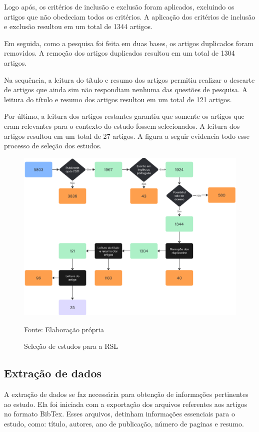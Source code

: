 Logo após, os critérios de inclusão e exclusão foram aplicados, excluindo os artigos que não obedeciam todos os critérios. A aplicação dos critérios de inclusão e exclusão resultou em um total de 1344 artigos.

Em seguida, como a pesquisa foi feita em duas bases, os artigos duplicados foram removidos. A remoção dos artigos duplicados resultou em um total de 1304 artigos.

Na sequência, a leitura do título e resumo dos artigos permitiu realizar o descarte de artigos que ainda sim não respondiam nenhuma das questões de pesquisa. A leitura do título e resumo dos artigos resultou em um total de 121 artigos.

Por último, a leitura dos artigos restantes garantiu que somente os artigos que eram relevantes para o contexto do estudo fossem selecionados. A leitura dos artigos resultou em um total de 27 artigos. A figura a seguir evidencia todo esse processo de seleção dos estudos.

\begin{figure}[H]
	\centering %
	\includegraphics[width=16cm]{figuras/selecao-estudos-rsl.png} %
	\caption{Seleção de estudos para a RSL}
	Fonte: Elaboração própria
	\label{figura:selecao-estudos-rsl}
\end{figure}

\subsection{Extração de dados}

A extração de dados se faz necessária para obtenção de informações pertinentes ao estudo. Ela foi iniciada com a exportação dos arquivos referentes aos artigos no formato BibTex. Esses arquivos, detinham informações essenciais para o estudo, como: título, autores, ano de publicação, número de paginas e resumo.

